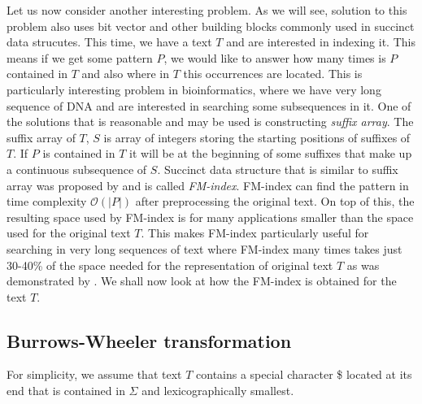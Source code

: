Let us now consider another interesting problem. As we will see, solution to this problem
also uses bit vector and other building blocks commonly used in succinct data strucutes.
This time, we have a text $T$ and are interested in indexing it. This means if we get some
pattern $P$, we would like to answer how many times is $P$ contained in $T$ and also where
in $T$ this occurrences are located. This is particularly interesting problem in bioinformatics,
where we have very long sequence of DNA and are interested in searching some subsequences
in it. One of the solutions that is reasonable and may be used is constructing
\textit{suffix array}. The suffix array of $T$, $S$ is array of integers storing
the starting positions of suffixes of $T$. If $P$ is contained in $T$ it will be at the
beginning of some suffixes that make up a continuous subsequence of $S$. Succinct data
structure that is similar to suffix array was proposed by \cite{ferragina2000opportunistic}
and is called \textit{FM-index}. FM-index can find the pattern in time complexity
$\mathcal{O}(|P|)$ after preprocessing the original text. On top of this, the resulting
space used by FM-index is for many applications smaller than the space used for the
original text $T$. This makes FM-index particularly useful for searching in very long sequences
of text where FM-index many times takes just 30-40\% of the space needed for the representation
of original text $T$ as was demonstrated by \cite{ferragina2001experimental}. We shall
now look at how the FM-index is obtained for the text $T$.

\subsection{Burrows-Wheeler transformation}

For simplicity, we assume that text $T$ contains a special character \$ located at its end
that is contained in $\Sigma$ and lexicographically smallest.

